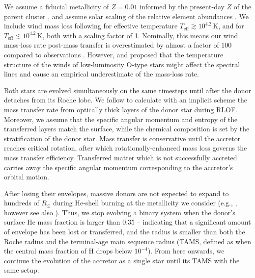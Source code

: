 \documentclass[twocolumn,twocolappendix,trackchanges]{aastex63}
\begin{document}
We assume a fiducial metallicity of $Z=0.01$ informed by the
present-day $Z$ of the parent cluster \citep{murphy:21}, and assume
solar scaling of the relative element abundances \citep{grevesse:98}. We include wind mass loss following
\cite{vink:00,vink:01} for effective
temperature $T_\mathrm{eff}\gtrsim10^{4.2}$\,K, and \cite{dejager:88} for  $T_\mathrm{eff}\lesssim10^{4.2}$\,K, both with a scaling
factor of 1. Nominally, this means our wind mass-loss rate post-mass
transfer is overestimated by almost a factor of 100 compared to
observations \citep[weak wind problem, see][]{marcolino:09}.  However,
\cite{lucy:12} and \cite{lagae:21} proposed that the temperature
structure of the winds of low-luminosity O-type stars might affect the
spectral lines and cause an empirical underestimate of the mass-loss
rate.

Both stars are evolved simultaneously on the same timesteps until
after the donor detaches from its Roche lobe. We follow \cite{kolb:90}
to calculate with an implicit scheme the mass transfer rate from
optically thick layers of the donor star during RLOF. Moreover, we
assume that the specific angular momentum and entropy of the
transferred layers match the surface, while the chemical composition
is set by the stratification of the donor star. Mass transfer is
conservative until the accretor reaches critical rotation, after which
rotationally-enhanced mass loss governs the mass transfer efficiency.
Transferred matter which is not successfully accreted carries away the
specific angular momentum corresponding to the accretor's orbital
motion.


After losing their envelopes, massive donors are not expected to
expand to hundreds of $R_\odot$ during He-shell burning at the
metallicity we consider (e.g., \citealt{laplace:20}, however see also
\citealt{gilkis:19}). Thus, we stop evolving a binary system when the
donor's surface He mass fraction is larger than 0.35 -- indicating
that a significant amount of envelope has been lost or transferred,
and the radius is smaller than both the Roche radius and the
terminal-age main sequence radius (TAMS, defined as when the central
mass fraction of H drops below $10^{-4}$). From here
onwards, %
we continue the evolution of the accretor as a single star until its TAMS
with the same setup.
\end{document}
